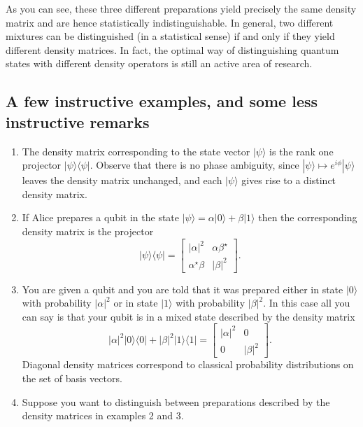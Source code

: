 \documentclass[fleqn]{article}
\begin{document}
As you can see, these three different preparations yield precisely the same density matrix and are hence statistically indistinguishable.
In general, two different mixtures can be distinguished (in a statistical sense) if and only if they yield different density matrices.
In fact, the optimal way of distinguishing quantum states with different density operators is still an active area of research.

\hypertarget{a-few-instructive-examples-and-some-less-instructive-remarks}{%
\subsection{A few instructive examples, and some less instructive remarks}\label{a-few-instructive-examples-and-some-less-instructive-remarks}}

\begin{enumerate}
\def\labelenumi{\arabic{enumi}.}
\item
  The density matrix corresponding to the state vector \(|\psi\rangle\) is the rank one projector \(|\psi\rangle\langle\psi|\).
  Observe that there is no phase ambiguity, since \(|\psi\rangle\mapsto e^{i\phi}|\psi\rangle\) leaves the density matrix unchanged, and each \(|\psi\rangle\) gives rise to a distinct density matrix.
\item
  If Alice prepares a qubit in the state \(|\psi\rangle = \alpha|0\rangle + \beta|1\rangle\) then the corresponding density matrix is the projector
  \[
     |\psi\rangle\langle\psi|
     =
     \begin{bmatrix}
       |\alpha|^2 & \alpha\beta^\star
     \\\alpha^\star\beta & |\beta|^2
     \end{bmatrix}.
   \]
\item
  You are given a qubit and you are told that it was prepared either in state \(|0\rangle\) with probability \(|\alpha|^2\) or in state \(|1\rangle\) with probability \(|\beta|^2\).
  In this case all you can say is that your qubit is in a mixed state described by the density matrix
  \[
     |\alpha|^2|0\rangle\langle 0| + |\beta|^2|1\rangle\langle 1|
     =
     \begin{bmatrix}
       |\alpha|^2 & 0
     \\0 & |\beta|^2
     \end{bmatrix}.
   \]
  Diagonal density matrices correspond to classical probability distributions on the set of basis vectors.
\item
  Suppose you want to distinguish between preparations described by the density matrices in examples 2 and 3.

\end{enumerate}
\end{document}
